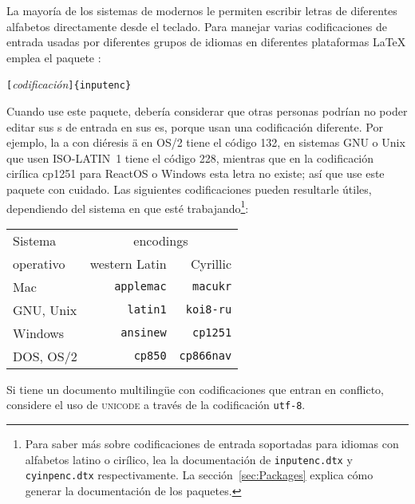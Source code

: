 \newcommand{\ieih}[1]{%
\index{encodings!input!#1@\texttt{#1}}%
\index{input encodings!#1@\texttt{#1}}%
\index{#1@\texttt{#1}}}
\newcommand{\iei}[1]{%
\ieih{#1}\texttt{#1}}
\newcommand{\feih}[1]{%
\index{encodings!font!#1@\texttt{#1}}%
\index{font encodings!#1@\texttt{#1}}%
\index{#1@\texttt{#1}}}
\newcommand{\fei}[1]{%
\feih{#1}\texttt{#1}}

La mayoría de los sistemas de \computernomo{} modernos le permiten escribir letras de diferentes alfabetos directamente desde el teclado.  Para manejar varias codificaciones de entrada usadas por diferentes grupos de idiomas en diferentes plataformas  \LaTeX{} emplea el paquete
:
\begin{lscommand}
\verb|[|\emph{codificación}\verb|]{inputenc}|
\end{lscommand}

Cuando use este paquete, debería considerar que otras personas podrían no poder editar sus \filenomo{}s de entrada en sus \computernomo{}es, porque usan una codificación diferente.  Por ejemplo, la a con diéresis \"a en OS/2 tiene el código 132, en sistemas GNU o Unix que usen ISO-LATIN~1 tiene el código 228, mientras que en la codificación cirílica cp1251 para ReactOS o Windows esta letra no existe; así que use este paquete con cuidado.  Las siguientes codificaciones pueden resultarle útiles, dependiendo del sistema en que esté trabajando\footnote{Para saber más sobre codificaciones de entrada soportadas para idiomas con alfabetos latino o cirílico, lea la documentación de \texttt{inputenc.dtx} y \texttt{cyinpenc.dtx} respectivamente.  La sección~\ref{sec:Packages} explica cómo generar la documentación de los paquetes.}:

\begin{center}
\begin{tabular}{l | r | r }
Sistema & \multicolumn{2}{c}{encodings}\\
operativo  & western Latin      & Cyrillic\\
\hline
Mac       &  \iei{applemac} & \iei{macukr}  \\
GNU, Unix &  \iei{latin1}   & \iei{koi8-ru} \\ 
Windows   &  \iei{ansinew}  & \iei{cp1251}  \\
DOS, OS/2 &  \iei{cp850}    & \iei{cp866nav}
\end{tabular}                
\end{center}                 

Si tiene un documento multilingüe con codificaciones que entran en conflicto, considere el uso de \textsc{unicode} a través de la codificación \texttt{utf-8}.

